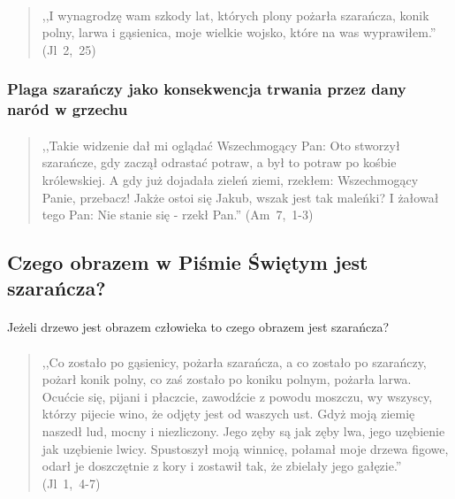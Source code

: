 \documentclass[10pt,a4paper,oneside]{article}
\begin{document}
\paragraph{}
\begin{quote}
,,I wynagrodzę wam szkody lat, których plony pożarła szarańcza, konik polny, larwa i gąsienica, moje wielkie wojsko, które na was wyprawiłem.'' \mbox{(Jl 2, 25)}
\end{quote}
\subsubsection{Plaga szarańczy jako konsekwencja trwania przez dany naród w grzechu}
\paragraph{}
\begin{quote}
,,Takie widzenie dał mi oglądać Wszechmogący Pan: Oto stworzył szarańcze, gdy zaczął odrastać potraw, a był to potraw po kośbie królewskiej. A gdy już dojadała zieleń ziemi, rzekłem: Wszechmogący Panie, przebacz! Jakże ostoi się Jakub, wszak jest tak maleńki? I żałował tego Pan: Nie stanie się - rzekł Pan.'' \mbox{(Am 7, 1-3)}
\end{quote}
\subsection{Czego obrazem w Piśmie Świętym jest szarańcza?}
\paragraph{}
Jeżeli drzewo jest obrazem człowieka to czego obrazem jest szarańcza?
\paragraph{}
\begin{quote}
,,Co zostało po gąsienicy, pożarła szarańcza, a co zostało po szarańczy, pożarł konik polny, co zaś zostało po koniku polnym, pożarła larwa. Ocućcie się, pijani i płaczcie, zawodźcie z powodu moszczu, wy wszyscy, którzy pijecie wino, że odjęty jest od waszych ust. Gdyż moją ziemię naszedł lud, mocny i niezliczony. Jego zęby są jak zęby lwa, jego uzębienie jak uzębienie lwicy. Spustoszył moją winnicę, połamał moje drzewa figowe, odarł je doszczętnie z kory i zostawił tak, że zbielały jego gałęzie.'' \mbox{(Jl 1, 4-7)}
\end{quote}
\end{document}
